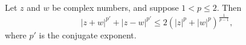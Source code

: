 Let $z$ and $w$ be complex numbers, and suppose $1 < p \leq 2$. Then
$$|z + w|^{p'} + |z - w|^{p'} \leq 2(|z|^p + |w|^p)^{\frac{1}{p-1}},$$
where $p'$ is the conjugate exponent.

